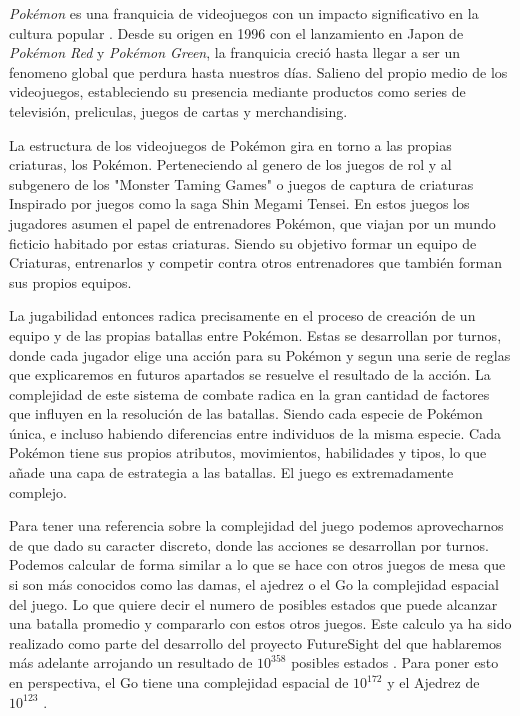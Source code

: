 \textit{Pokémon} es una franquicia de videojuegos con un impacto significativo en la cultura popular \cite{Bokksu}. Desde su origen en 1996 con el lanzamiento en Japon de \textit{Pokémon Red} y \textit{Pokémon Green}, la franquicia creció hasta llegar a ser un fenomeno global que perdura hasta nuestros días. Salieno del propio medio de los videojuegos, estableciendo su presencia mediante productos como series de televisión, preliculas, juegos de cartas y merchandising. 

La estructura de los videojuegos de Pokémon gira en torno a las propias criaturas, los Pokémon. Perteneciendo al genero de los juegos de rol y al subgenero de los "Monster Taming Games" o juegos de captura de criaturas Inspirado por juegos como la saga Shin Megami Tensei. En estos juegos los jugadores asumen el papel de entrenadores Pokémon, que viajan por un mundo ficticio habitado por estas criaturas. Siendo su objetivo formar un equipo de Criaturas, entrenarlos y competir contra otros entrenadores que también forman sus propios equipos.

La jugabilidad entonces radica precisamente en el proceso de creación de un equipo y de las propias batallas entre Pokémon. Estas se desarrollan por turnos, donde cada jugador elige una acción para su Pokémon y segun una serie de reglas que explicaremos en futuros apartados se resuelve el resultado de la acción. La complejidad de este sistema de combate radica en la gran cantidad de factores que influyen en la resolución de las batallas. Siendo cada especie de Pokémon única, e incluso habiendo diferencias entre individuos de la misma especie. Cada Pokémon tiene sus propios atributos, movimientos, habilidades y tipos, lo que añade una capa de estrategia a las batallas. El juego es extremadamente complejo.

Para tener una referencia sobre la complejidad del juego podemos aprovecharnos de que dado su caracter discreto, donde las acciones se desarrollan por turnos. Podemos calcular de forma similar a lo que se hace con otros juegos de mesa que si son más conocidos como las damas, el ajedrez o el Go la complejidad espacial del juego. Lo que quiere decir el numero de posibles estados que puede alcanzar una batalla promedio y compararlo con estos otros juegos. Este calculo ya ha sido realizado como parte del desarrollo del proyecto FutureSight del que hablaremos más adelante arrojando un resultado de $10^{358}$ posibles estados \cite{FutureSightTotalBattleSituations}. Para poner esto en perspectiva, el Go tiene una complejidad espacial de $10^{172}$ y el Ajedrez de $10^{123}$ \cite{GoComplexity}.

